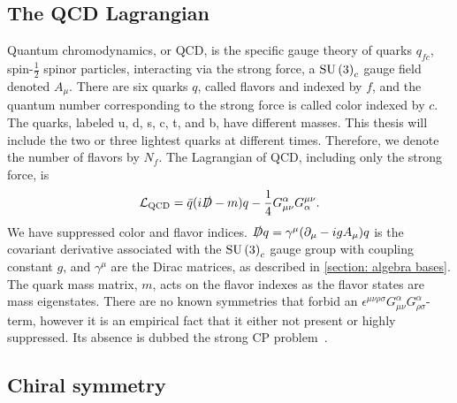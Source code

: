 \subsection{The QCD Lagrangian}

Quantum chromodynamics, or QCD, is the specific gauge theory of quarks $q_{fc}$, spin-$\frac{1}{2}$ spinor particles, interacting via the strong force, a $\text{SU}\left(3\right)_c$ gauge field denoted $A_\mu$.
There are six quarks $q$, called flavors and indexed by $f$, and the quantum number corresponding to the strong force is called color indexed by $c$.
The quarks, labeled u, d, s, c, t, and b, have different masses.
This thesis will include the two or three lightest quarks at different times.
Therefore, we denote the number of flavors by $N_f$.
The Lagrangian of QCD, including only the strong force, is
%
\begin{equation}
    \mathcal{L}_{\text{QCD}} 
    = \bar q (i \slashed D - m)q - \frac{1}{4} G_{\mu \nu}^\alpha G^{\mu \nu}_\alpha.
\end{equation}
%
We have suppressed color and flavor indices.
$\slashed D q = \gamma^\mu (\partial_\mu - i g A_\mu) q$ is the covariant derivative associated with the $\text{SU}\left(3\right)_c$ gauge group with coupling constant $g$, and $\gamma^\mu$ are the Dirac matrices, as described in \autoref{section: algebra bases}.
The quark mass matrix, $m$, acts on the flavor indexes as the flavor states are mass eigenstates.
There are no known symmetries that forbid an $\epsilon^{\mu \nu \rho \sigma} G_{\mu \nu}^\alpha G_{\rho \sigma}^\alpha$-term, however it is an empirical fact that it either not present or highly suppressed. 
Its absence is dubbed the strong CP problem~\autocite{schwartzQuantumFieldTheory2013}.



\subsection{Chiral symmetry}

